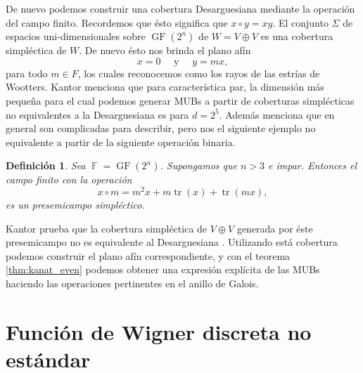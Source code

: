 \documentclass[a4paper,11pt]{report}
\DeclareMathOperator{\F}{\mathbb{F}}
\DeclareMathOperator{\tr}{tr}
\DeclareMathOperator{\GF}{GF}
\newtheorem{definition}{Definición}
\begin{document}
  De nuevo podemos construir una cobertura Desarguesiana
  mediante la operación del campo finito. Recordemos que
  ésto significa que $x \circ y = xy$. El conjunto $\Sigma$
  de espacios uni-dimensionales sobre $\GF(2^{n})$ de $W = V
  \oplus V$ es una cobertura simpléctica de $W$.  De nuevo
  ésto nos brinda el plano afín
  \begin{equation}
    x = 0
    \quad \text{ y } \quad
    y = mx,
  \end{equation}
  para todo $m \in F$, los cuales reconocemos como los rayos
  de las estrías de Wootters. Kantor menciona que para
  característica par, la dimensión más pequeña para el cual
  podemos generar MUBs a partir de coberturas simplécticas
  no equivalentes a la Desarguesiana es para $d = 2^{5}$.
  Además menciona que en general son complicadas para
  describir, pero nos el siguiente ejemplo no equivalente a
  partir de la siguiente operación binaria.
  \begin{definition}
    \label{def:kantor_even_alt}
    Sea $\F = \GF(2^{n})$. Supongamos que $n >
    3$ e impar. Entonces el campo finito con la operación
    \begin{equation}
      x \circ m
      = m^2x + m\tr(x) + \tr(mx),
    \end{equation}
    es un presemicampo simpléctico.
  \end{definition}
  Kantor prueba que la cobertura simpléctica de $V \oplus V$
  generada por éste presemicampo no es equivalente al
  Desarguesiana \cite{kantor2012}. Utilizando está cobertura
  podemos construir el plano afín correspondiente, y con el
  teorema \ref{thm:kanat_even} podemos obtener una expresión
  explícita de las MUBs haciendo las operaciones pertinentes
  en el anillo de Galois.

  \section{Función de Wigner discreta no estándar}
\end{document}
